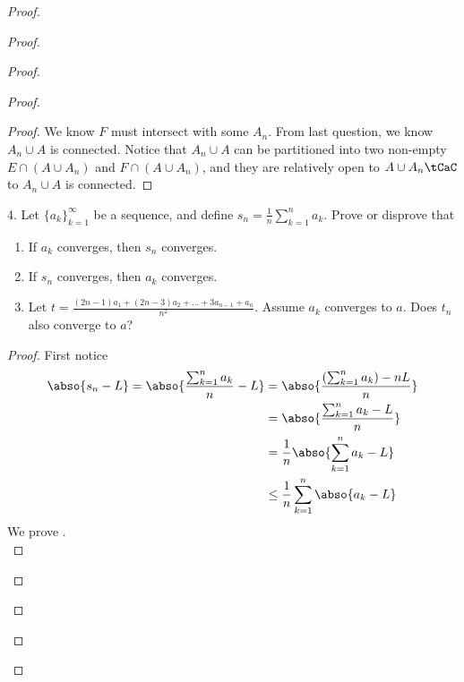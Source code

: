 \documentclass{report}
\begin{document}
\begin{proof}
\begin{proof}
\begin{proof}
\begin{proof}
\begin{proof}
We know $F$ must intersect with some  $A_n$. From last question, we know $A_n\cup A$ is connected. Notice that $A_n\cup A$ can be partitioned into two non-empty $E\cap (A\cup A_n)$ and $F\cap (A\cup A_n)$, and they are relatively open to $A\cup A_n\tCaC$ to $A_n\cup A$ is connected.
\end{proof}
\begin{question}{}{}
4. Let $\{a_k\}_{k=1}^{\infty}$ be a sequence, and define $s_n = \frac{1}{n} \sum_{k=1}^{n} a_k$. Prove or disprove that
\begin{enumerate}[label=(\alph*)]
  \item If ${a_k}$ converges, then $s_n$ converges.\\
  \item If $s_n$ converges, then $a_k$ converges.\\
  \item Let $t = \frac{(2n-1)a_1 + (2n-3)a_2 + \ldots + 3a_{n-1} + a_n}{n^2}$. Assume ${a_k}$ converges to $a$. Does $t_n$ also converge to $a$?
\end{enumerate}
\end{question}
\begin{proof}
First notice
\begin{align*}
  \abso{s_n-L}=\abso{\frac{\sum_{k=1}^n a_k}{n}-L}&=\abso{\frac{(\sum_{k=1}^na_k)-nL}{n}}\\
  &=\abso{\frac{\sum _{k=1}^n a_k-L}{n}}\\
  &=\frac{1}{n}\abso{\sum_{k=1}^n a_k-L}\\
  &\leq \frac{1}{n} \sum_{k=1}^n \abso{a_k-L}
\end{align*}
We prove .\\


\end{proof}
\end{proof}
\end{proof}
\end{proof}
\end{proof}
\end{document}
